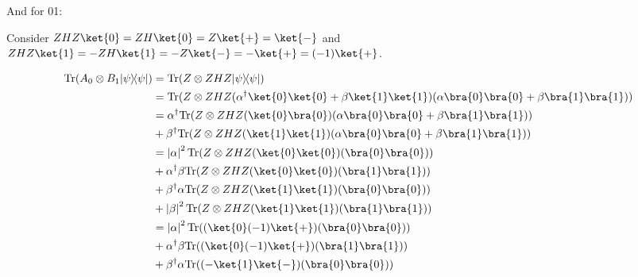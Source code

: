 \documentclass{article}
\newcommand{\ketbra}[2]{|#1\rangle\!\langle #2|}
\newcommand{\trace}{{\rm Tr}}
\newcommand{\abs}[1]{\left\lvert #1 \right\rvert}
\begin{document}
\begin{enumerate}
\begin{enumerate}
                And for 01:

                Consider $ZHZ\ket{0}=ZH\ket{0}=Z\ket{+}=\ket{-}$ and $ZHZ\ket{1}=-ZH\ket{1}=-Z\ket{-}=-\ket{+}=(-1)\ket{+}$.

                $$\begin{aligned}
                    \trace(A_0\otimes B_1\ketbra{\psi}{\psi}) & = \trace(Z\otimes ZHZ\ketbra{\psi}{\psi})                                                                          \\
                                                              & = \trace(Z\otimes ZHZ(\alpha^\dagger\ket{0}\ket{0}+\beta\ket{1}\ket{1})(\alpha\bra{0}\bra{0}+\beta\bra{1}\bra{1})) \\
                                                              & = \alpha^\dagger\trace(Z\otimes ZHZ(\ket{0}\bra{0})(\alpha\bra{0}\bra{0}+\beta\bra{1}\bra{1}))                     \\
                                                              & + \beta^\dagger\trace(Z\otimes ZHZ(\ket{1}\ket{1})(\alpha\bra{0}\bra{0}+\beta\bra{1}\bra{1}))                      \\
                                                              & = \abs{\alpha}^2\trace(Z\otimes ZHZ(\ket{0}\ket{0})(\bra{0}\bra{0}))                                               \\
                                                              & + \alpha^\dagger\beta\trace(Z\otimes ZHZ(\ket{0}\ket{0})(\bra{1}\bra{1}))                                          \\
                                                              & + \beta^\dagger\alpha\trace(Z\otimes ZHZ(\ket{1}\ket{1})(\bra{0}\bra{0}))                                          \\
                                                              & + \abs{\beta}^2\trace(Z\otimes ZHZ(\ket{1}\ket{1})(\bra{1}\bra{1}))                                                \\
                                                              & = \abs{\alpha}^2\trace((\ket{0}(-1)\ket{+})(\bra{0}\bra{0}))                                                       \\
                                                              & + \alpha^\dagger\beta\trace((\ket{0}(-1)\ket{+})(\bra{1}\bra{1}))                                                  \\
                                                              & + \beta^\dagger\alpha\trace((-\ket{1}\ket{-})(\bra{0}\bra{0}))                                                     \\

\end{aligned}$$
\end{enumerate}
\end{enumerate}
\end{document}
